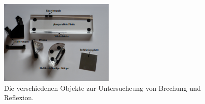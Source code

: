         \begin{figure}
            \centering
            \includegraphics[width = 0.5\textwidth]{bilder/objekte.PNG}
            \caption{Die verschiedenen Objekte zur Untersucheung von Brechung und Reflexion.\cite{anleitung}}
            \label{fig:objekte}
        \end{figure}

